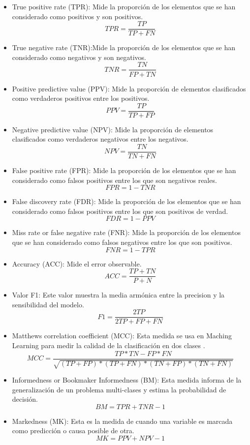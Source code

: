 \begin{itemize}
\item True positive rate (TPR): Mide la proporción de los elementos que se han considerado como positivos y son positivos.
\[TPR=\frac{TP}{TP+FN}\]

\item True negative rate (TNR):Mide la proporción de los elementos que se han considerado como negativos y son negativos. 
\[TNR=\frac{TN}{FP+TN}\]

\item Positive predictive value (PPV): Mide la proporción de elementos clasificados como verdaderos positivos entre los positivos.
\[PPV=\frac{TP}{TP+FP}\]


\item Negative predictive value (NPV): Mide la proporción de elementos clasificados como verdaderos negativos entre los negativos.  
\[NPV=\frac{TN}{TN+FN}\]


\item False positive rate (FPR):
Mide la proporción de los elementos que se han considerado como falsos positivos entre los que son negativos reales.
 \[FPR=1-TNR\]

\item False discovery rate (FDR):
Mide la proporción de los elementos que se han considerado como falsos positivos entre los que son positivos de verdad.
\[FDR=1-PPV\]

\item Miss rate or false negative rate (FNR):
Mide la proporción de los elementos que se han considerado como falsos negativos entre los que son  positivos. \[FNR=1-TPR\]

\item Accuracy (ACC): Mide el error observable.
\[ACC=\frac{TP+TN}{P+N}\]

\item Valor F1: Este valor muestra la media armónica entre la precision y la sensibilidad del modelo.
\[F1=\frac{2TP}{2TP+FP+FN}\]

\item Matthews correlation coefficient (MCC):
Esta medida se usa en Maching Learning para medir la calidad de la clasificación en dos clases \cite{wiki:machineMCC}.
 \[MCC=\frac{TP*TN-FP*FN}{\sqrt{(TP+FP)*(TP+FN)*(TN+FP)*(TN+FN)}}\]
 
\item Informedness or Bookmaker Informedness (BM):
Esta medida informa de la generalización de un problema multi-clases y estima la probabilidad de decisión.
 \[BM=TPR+TNR-1\]

\item Markedness (MK):
Esta es la medida de cuando una variable es marcada como predicción o causa posible de otra.
 \[MK=PPV+NPV-1\]


\end{itemize}



